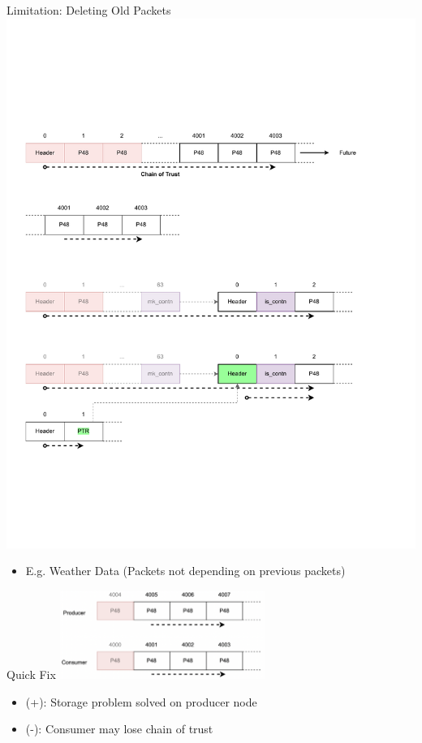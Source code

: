 \documentclass[aspectratio=169]{beamer}
\begin{document}
\begin{frame}[c]{Limitation: Deleting Old Packets}
\includegraphics[width=1\textwidth]{images/session_1.pdf}
\begin{itemize}
	\item E.g. Weather Data (Packets not depending on previous packets)
\end{itemize}
\end{frame}

\begin{frame}[c]{Quick Fix}
\includegraphics[width=0.5\textwidth]{images/session_2i.png}
\begin{itemize}
	\item (+): Storage problem solved on producer node
	\item (-): Consumer may lose chain of trust
\end{itemize}
\end{frame}
\end{document}
